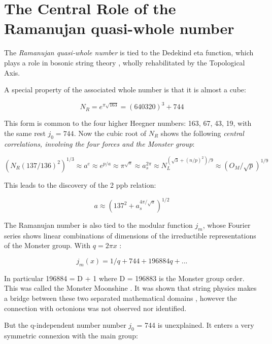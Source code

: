 \documentclass[a4paper,9pt]{article}
\begin{document}
\section{The Central Role of the Ramanujan quasi-whole number}

The \textit{Ramanujan quasi-whole number} is tied to the Dedekind eta function, which plays a role in bosonic string theory \cite{Apostol}\cite{Lovelace}, wholly rehabilitated by the Topological Axis.


A special property of the associated whole number is that it is almost a cube:

\begin{equation}
N_R = e^{\pi \sqrt{163}} = (640320)^3 + 744
\end{equation}

This form is common to the four higher Heegner numbers: 163, 67, 43, 19, with the same rest $j_0 = 744$. Now the cubic root of $N_R$ shows the following \textit {central correlations, involving the four forces and the Monster group}:

\begin{equation}
(N_R (137/136)^2)^{1/3} \approx a^e \approx e^{p/a} \approx \pi^{\sqrt a} \approx a_s^{2\pi} \approx N_L^{(\sqrt{3} +(n/p)^2)/9} \approx (O_M/\sqrt{p})^{1/9}
\end{equation}

This leads to the discovery of the 2 ppb relation:

\begin{equation}
a \approx (137^2 + a_s^{4\pi/\sqrt{a}})^{1/2}
\end{equation}

The Ramanujan number is also tied to the modular function $j_m$, whose Fourier series shows linear combinations of dimensions of the irreductible representations of the Monster group. With $q = 2\pi x$ :

\begin{equation}
j_m(x) = 1/q + 744 + 196884 q + ...
\end{equation}

In particular 196884 = D + 1 where D = 196883 is the Monster group order. This was called the Monster Moonshine \cite{Conway}. It was shown that string physics makes a bridge between these two separated mathematical domains \cite{Borcherds}, however the connection with octonions was not observed nor identified. 


But the q-independent number number $j_0$ = 744 is unexplained. It enters a very symmetric connexion with the main group:
\end{document}
